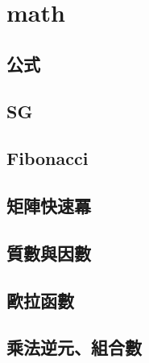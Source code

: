 %         

\section{math}
    \subsection{公式}
        
    \subsection{SG}
        
    \subsection{Fibonacci}
        
    \subsection{矩陣快速冪}
        
    \subsection{質數與因數}
          
    \subsection{歐拉函數}
        
    \subsection{乘法逆元、組合數}
        
        
        
